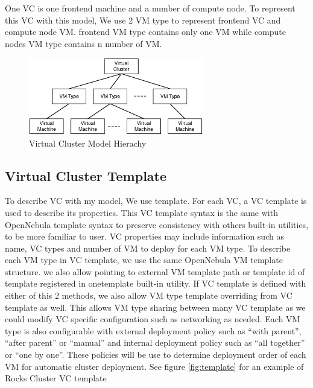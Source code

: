 \documentclass[conference]{IEEEtran}
\begin{document}
One VC is one frontend machine and a number of compute node.
To represent this VC with this model, We use 2 VM type to represent frontend VC and compute node VM.
frontend VM type contains only one VM while compute nodes VM type contains n number of VM.


\begin{figure}[!t]
\centering
\includegraphics[width=3in]{model}
\caption{Virtual Cluster Model Hierachy}
\label{fig:model}
\end{figure}

\subsection{Virtual Cluster Template}
To describe VC with my model, We use template.
For each VC, a VC template is used to describe its properties.
This VC template syntax is the same with OpenNebula template syntax to preserve consistency with others built-in utilities, to be more familiar to user.
VC properties may include information such as name, VC types and number of VM to deploy for each VM type.
To describe each VM type in VC template, we use the same OpenNebula VM template structure.
we also allow pointing to external VM template path or template id of template registered in onetemplate built-in utility.
If VC template is defined with either of this 2 methods, we also allow VM type template overriding from VC template as well.
This allows VM type sharing between many VC template as we could modify VC specific configuration such as networking as needed.
Each VM type is also configurable with external deployment policy such as ``with parent'', ``after parent'' or ``manual'' and internal deployment policy such as ``all together'' or ``one by one''.
These policies will be use to determine deployment order of each VM for automatic cluster deployment.
See figure \ref{fig:template} for an example of Rocks Cluster VC template
\end{document}
